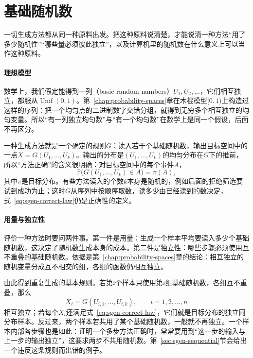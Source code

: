 \section{基础随机数}
\label{sec:sgen-uniform}

一切生成方法都从同一种原料出发。把这种原料说清楚，才能说清一种方法“用了多少随机性”“哪些量必须彼此独立”，以及计算机里的随机数在什么意义上可以当作这种原料。

\paragraph{理想模型}
数学上，我们假定能得到一列（basic random numbers）$U_1,U_2,\dots$，它们相互独立，都服从$\operatorname{Unif}(0,1)$。第~\ref{chap:probability-spaces}章在木棍模型$[0,1)$上构造过这样的序列：把一个均匀点的二进制数字交错分组，就得到无穷多个相互独立的均匀变量。所以“有一列独立均匀数”与“有一个均匀数”在数学上是同一个假设，后面不再区分。

一种生成方法就是一个确定的规则$G$：读入若干个基础随机数，输出目标空间中的一点$X=G(U_1,\dots,U_k)$。输出的分布是$(U_1,\dots,U_k)$的均匀分布在$G$下的推前，所以“方法正确”的含义很明确：对目标空间中的每个事件$A$，
\begin{equation}
  \mathbb{P}\bigl(G(U_1,\dots,U_k)\in A\bigr)=\pi(A),
  \label{eq:sgen-correct-law}
\end{equation}
其中$\pi$是目标分布。有些方法读入的个数$k$本身是随机的，例如后面的拒绝筛选要试到成功为止；这时$G$从序列中按顺序取数，读多少由已经读到的数决定，式~\eqref{eq:sgen-correct-law}仍是正确性的定义。

\paragraph{用量与独立性}
评价一种方法时要问两件事。第一件是用量：生成一个样本平均要读入多少个基础随机数，这决定了随机数生成本身的成本。第二件是独立性：哪些步骤必须使用互不重叠的基础随机数。依据是第~\ref{chap:probability-spaces}章的结论：相互独立的随机变量分成互不相交的组，各组的函数仍相互独立。

由此得到重复生成的基本规则。若第$i$个样本只使用第$i$组基础随机数，各组互不重叠，那么
\[
  X_i=G(U_{i,1},\dots,U_{i,k}),\qquad i=1,2,\dots,n
\]
相互独立；若每个$X_i$还满足式~\eqref{eq:sgen-correct-law}，它们就是目标分布的独立同分布样本。反过来，两个样本若共用了某个基础随机数，一般就不再独立。一个样本内部各步骤也是如此：证明一个多步方法正确时，常常要用到“这一步的输入与上一步的输出独立”，这要求两步不共用随机数。第~\ref{sec:sgen-sequential}节会给出一个违反这条规则而出错的例子。

